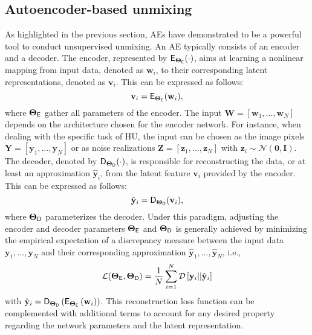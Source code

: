 \documentclass[journal,a4paper]{IEEEtran}
\newcommand{\bfY}{\mathbf{Y}}
\newcommand{\bfy}{\mathbf{y}}
\newcommand{\bfv}{\mathbf{v}}
\newcommand{\bfw}{\mathbf{w}}
\newcommand{\bfW}{\mathbf{W}}
\newcommand{\bfz}{\mathbf{z}}
\newcommand{\bfZ}{\mathbf{Z}}
\newcommand{\bTheta}{\boldsymbol{\Theta}}
\begin{document}
\subsection{Autoencoder-based unmixing}
As highlighted in the previous section, AEs have demonstrated to be a powerful tool to conduct unsupervised unmixing. An AE typically consists of an encoder and a decoder. The encoder, represented by $\mathsf{E}_{\bTheta_{\sf E}}(\cdot)$, aims at learning a nonlinear mapping from input data, denoted as $\bfw_i$, to their corresponding latent representations, denoted as $\bfv_i$. This can be expressed as follows:
\begin{equation}\label{eq.encoder}
  \bfv_i= \mathsf{E}_{\bTheta_{\sf E}}(\bfw_i),
\end{equation}
where $\bTheta_{\sf E}$ gather all parameters of the encoder. The input $\bfW=\left[\bfw_1,\ldots,\bfw_N\right]$ depends on the architecture chosen for the encoder network. For instance, when dealing with the specific task of HU, the input can be chosen as the image pixels $\bfY=\left[\bfy_1,\ldots,\bfy_N\right]$ or as noise realizations $\bfZ=\left[\bfz_1,\ldots,\bfz_N\right]$ with $\bfz_i \sim \mathcal{N}(\boldsymbol{0},\mathbf{I})$. The decoder, denoted by $\mathsf{D}_{\bTheta_{\sf D}}(\cdot)$, is responsible for reconstructing the data, or at least an approximation $\hat{\bfy}_i$, from the latent feature $\bfv_i$ provided by the encoder. This can be expressed as follows:
\begin{equation}\label{eq.decoder}
  \hat{\bfy}_i= \mathsf{D}_{\bTheta_{\sf D}}(\bfv_i),
\end{equation}
where $\bTheta_{\sf D}$ parameterizes the decoder. Under this paradigm, adjusting the encoder and decoder parameters $\bTheta_{\sf E}$ and $\bTheta_{\sf D}$ is generally achieved by minimizing the empirical expectation of a discrepancy measure between the input data $\bfy_1,\ldots,\bfy_N$ and their corresponding approximation $\hat{\bfy}_1,\ldots,\hat{\bfy}_N$, i.e.,
\begin{equation}\label{eq.loss_ae}
  \mathcal{L}(\bTheta_{\sf E},\bTheta_{\sf D})=\frac{1}{N}\sum_{i=1}^{N}\mathcal{D}\left[\mathbf{y}_i||
  \hat{\bfy}_i\right]
\end{equation}
with $\hat{\bfy}_i= \mathsf{D}_{\bTheta_{\sf D}}\left(\mathsf{E}_{\bTheta_{\sf E}}\left(\bfw_i\right)\right)$. This reconstruction loss function can be complemented with additional terms to account for any desired property regarding the network parameters and the latent representation. %
\end{document}
